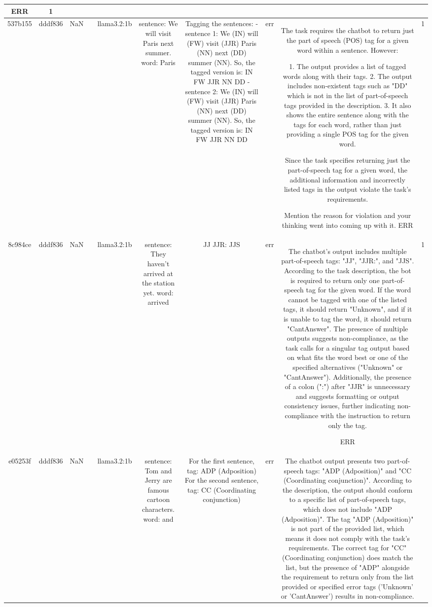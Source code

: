 \begin{table}[h!]
\begin{tabular}{|c|c|c|c|c|c|c|c|c|c|}
ERR & 1\\
\hline
537b155 & dddf836 & NaN &  & llama3.2:1b & sentence: We will visit Paris next summer. word: Paris & Tagging the sentences:
- sentence 1: We (IN) will (FW) visit (JJR) Paris (NN) next (DD) summer (NN). So, the tagged version is: IN FW JJR NN DD
- sentence 2: We (IN) will (FW) visit (JJR) Paris (NN) next (DD) summer (NN). So, the tagged version is: IN FW JJR NN DD & err & The task requires the chatbot to return just the part of speech (POS) tag for a given word within a sentence. However:

1. The output provides a list of tagged words along with their tags.
2. The output includes non-existent tags such as "DD" which is not in the list of part-of-speech tags provided in the description. 
3. It also shows the entire sentence along with the tags for each word, rather than just providing a single POS tag for the given word.

Since the task specifies returning just the part-of-speech tag for a given word, the additional information and incorrectly listed tags in the output violate the task's requirements.

Mention the reason for violation and your thinking went into coming up with it.
ERR & 1\\
\hline
8c984ce & dddf836 & NaN &  & llama3.2:1b & sentence: They haven't arrived at the station yet. word: arrived & JJ 
JJR: 
JJS & err & The chatbot's output includes multiple part-of-speech tags: "JJ", "JJR:", and "JJS". According to the task description, the bot is required to return only one part-of-speech tag for the given word. If the word cannot be tagged with one of the listed tags, it should return "Unknown", and if it is unable to tag the word, it should return "CantAnswer". The presence of multiple outputs suggests non-compliance, as the task calls for a singular tag output based on what fits the word best or one of the specified alternatives ("Unknown" or "CantAnswer"). Additionally, the presence of a colon (":") after "JJR" is unnecessary and suggests formatting or output consistency issues, further indicating non-compliance with the instruction to return only the tag.

ERR & 1\\
\hline
e05253f & dddf836 & NaN &  & llama3.2:1b & sentence: Tom and Jerry are famous cartoon characters. word: and & For the first sentence, tag: ADP (Adposition) 
For the second sentence, tag: CC (Coordinating conjunction) & err & The chatbot output presents two part-of-speech tags: "ADP (Adposition)" and "CC (Coordinating conjunction)". According to the description, the output should conform to a specific list of part-of-speech tags, which does not include "ADP (Adposition)". The tag "ADP (Adposition)" is not part of the provided list, which means it does not comply with the task's requirements. The correct tag for "CC" (Coordinating conjunction) does match the list, but the presence of "ADP" alongside the requirement to return only from the list provided or specified error tags ('Unknown' or 'CantAnswer') results in non-compliance. 


\end{tabular}
\end{table}

